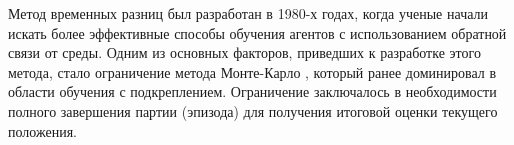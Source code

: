 Метод временных разниц был разработан в 1980-х годах, когда ученые начали искать более эффективные способы обучения агентов с использованием обратной связи от среды. Одним из основных факторов, приведших к разработке этого метода, стало ограничение метода Монте-Карло \cite{amm-first-article}, который ранее доминировал в области обучения с подкреплением. Ограничение заключалось в необходимости полного завершения партии (эпизода) для получения итоговой оценки текущего положения.
